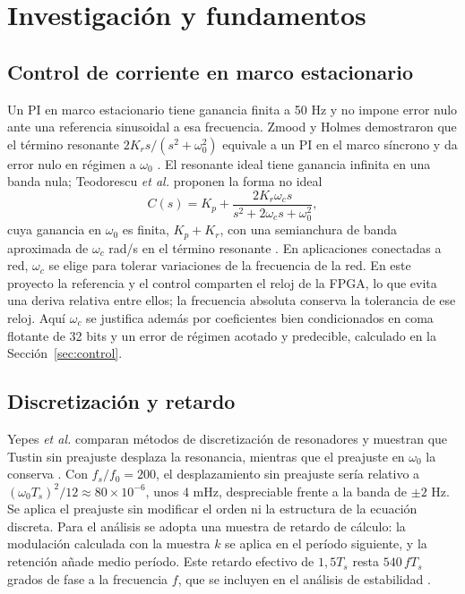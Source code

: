 \documentclass[conference]{IEEEtran}
\begin{document}
\section{Investigación y fundamentos}
\subsection{Control de corriente en marco estacionario}
Un PI en marco estacionario tiene ganancia finita a 50 Hz y no impone error nulo ante una referencia sinusoidal a esa frecuencia. Zmood y Holmes demostraron que el término resonante $2K_rs/(s^2+\omega_0^2)$ equivale a un PI en el marco síncrono y da error nulo en régimen a $\omega_0$ \cite{zmood}. El resonante ideal tiene ganancia infinita en una banda nula; Teodorescu \emph{et al.} proponen la forma no ideal
\begin{equation}
C(s)=K_p+\frac{2K_r\omega_cs}{s^2+2\omega_cs+\omega_0^2},
\label{eq:pr}
\end{equation}
cuya ganancia en $\omega_0$ es finita, $K_p+K_r$, con una semianchura de banda aproximada de $\omega_c$ rad/s en el término resonante \cite{teodorescu,pr}. En aplicaciones conectadas a red, $\omega_c$ se elige para tolerar variaciones de la frecuencia de la red. En este proyecto la referencia y el control comparten el reloj de la FPGA, lo que evita una deriva relativa entre ellos; la frecuencia absoluta conserva la tolerancia de ese reloj. Aquí $\omega_c$ se justifica además por coeficientes bien condicionados en coma flotante de 32 bits y un error de régimen acotado y predecible, calculado en la Sección~\ref{sec:control}.

\subsection{Discretización y retardo}
Yepes \emph{et al.} comparan métodos de discretización de resonadores y muestran que Tustin sin preajuste desplaza la resonancia, mientras que el preajuste en $\omega_0$ la conserva \cite{yepes}. Con $f_s/f_0=200$, el desplazamiento sin preajuste sería relativo a $(\omega_0T_s)^2/12\approx80\times10^{-6}$, unos 4 mHz, despreciable frente a la banda de $\pm2$ Hz. Se aplica el preajuste sin modificar el orden ni la estructura de la ecuación discreta. Para el análisis se adopta una muestra de retardo de cálculo: la modulación calculada con la muestra $k$ se aplica en el período siguiente, y la retención añade medio período. Este retardo efectivo de $1{,}5T_s$ resta $540\,fT_s$ grados de fase a la frecuencia $f$, que se incluyen en el análisis de estabilidad \cite{buso}.
\end{document}
